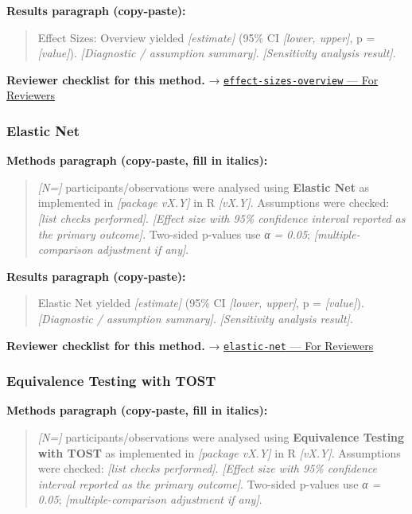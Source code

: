 \documentclass[
]{article}
\begin{document}
\textbf{Results paragraph (copy-paste):}

\begin{quote}
Effect Sizes: Overview yielded \emph{{[}estimate{]}} (95\% CI
\emph{{[}lower, upper{]}}, p = \emph{{[}value{]}}). \emph{{[}Diagnostic
/ assumption summary{]}}. \emph{{[}Sensitivity analysis result{]}}.
\end{quote}

\textbf{Reviewer checklist for this method.} →
\href{../chapters/04-inferential/effect-sizes-overview.Rmd\#for-reviewers}{\texttt{effect-sizes-overview}
--- For Reviewers}

\subsubsection{Elastic Net}\label{elastic-net}

\textbf{Methods paragraph (copy-paste, fill in italics):}

\begin{quote}
\emph{{[}N={]}} participants/observations were analysed using
\textbf{Elastic Net} as implemented in \emph{{[}package vX.Y{]}} in R
\emph{{[}vX.Y{]}}. Assumptions were checked: \emph{{[}list checks
performed{]}}. \emph{{[}Effect size with 95\% confidence interval
reported as the primary outcome{]}}. Two-sided p-values use \emph{α =
0.05}; \emph{{[}multiple-comparison adjustment if any{]}}.
\end{quote}

\textbf{Results paragraph (copy-paste):}

\begin{quote}
Elastic Net yielded \emph{{[}estimate{]}} (95\% CI \emph{{[}lower,
upper{]}}, p = \emph{{[}value{]}}). \emph{{[}Diagnostic / assumption
summary{]}}. \emph{{[}Sensitivity analysis result{]}}.
\end{quote}

\textbf{Reviewer checklist for this method.} →
\href{../chapters/07-regression/elastic-net.Rmd\#for-reviewers}{\texttt{elastic-net}
--- For Reviewers}

\subsubsection{Equivalence Testing with
TOST}\label{equivalence-testing-with-tost}

\textbf{Methods paragraph (copy-paste, fill in italics):}

\begin{quote}
\emph{{[}N={]}} participants/observations were analysed using
\textbf{Equivalence Testing with TOST} as implemented in
\emph{{[}package vX.Y{]}} in R \emph{{[}vX.Y{]}}. Assumptions were
checked: \emph{{[}list checks performed{]}}. \emph{{[}Effect size with
95\% confidence interval reported as the primary outcome{]}}. Two-sided
p-values use \emph{α = 0.05}; \emph{{[}multiple-comparison adjustment if
any{]}}.
\end{quote}
\end{document}

